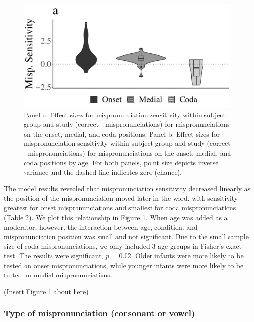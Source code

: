 \documentclass[
  man, noextraspace]{apa6}
\begin{document}
\begin{figure}
\centering
\includegraphics{VonHolzenBergmann_MPMetaAnalysis_files/figure-latex/PlotMispPosit-1.pdf}
\caption{\label{fig:PlotMispPosit}Panel a: Effect sizes for mispronunciation sensitivity within subject group and study (correct - mispronunciations) for mispronunciations on the onset, medial, and coda positions. Panel b: Effect sizes for mispronunciation sensitivity within subject group and study (correct - mispronunciations) for mispronunciations on the onset, medial, and coda positions by age. For both panels, point size depicts inverse variance and the dashed line indicates zero (chance).}
\end{figure}

The model results revealed that mispronunciation sensitivity decreased linearly as the position of the mispronunciation moved later in the word, with sensitivity greatest for onset mispronunciations and smallest for coda mispronunciations (Table 2). We plot this relationship in Figure \ref{fig:PlotMispPosit}. When age was added as a moderator, however, the interaction between age, condition, and mispronunciation position was small and not significant. Due to the small sample size of coda mispronunciations, we only included 3 age groups in Fisher's exact test. The results were significant, \emph{p} = 0.02. Older infants were more likely to be tested on onset mispronunciations, while younger infants were more likely to be tested on medial mispronunciations.

(Insert Figure \ref{fig:PlotMispPosit} about here)

\hypertarget{type-of-mispronunciation-consonant-or-vowel}{%
\subsubsection{Type of mispronunciation (consonant or vowel)}\label{type-of-mispronunciation-consonant-or-vowel}}
\end{document}
